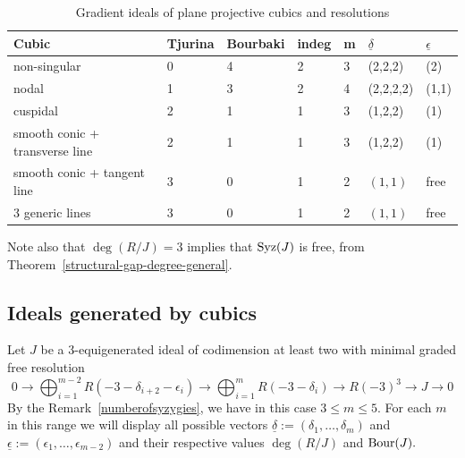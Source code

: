 \documentclass[11pt]{amsart} %
\theoremstyle{definition}
\def\syz{\mbox{\rm Syz}}
\begin{document}
\begin{table}[H]
\caption{Gradient ideals of plane projective cubics and resolutions}
\begin{tabular}{|l|l|l|l|l|l|l|}
\hline
Cubic                & Tjurina & Bourbaki & indeg & m & $\underline{\delta}$ & $\underline{\epsilon}$ \\ \hline
non-singular         & 0       & 4               & 2              & 3 & (2,2,2)                                            & (2)                                                  \\ \hline
nodal                & 1       & 3               & 2              & 4 & (2,2,2,2)                                          & (1,1)                                                \\ \hline
cuspidal             & 2       & 1               & 1              & 3 & (1,2,2)                                            & (1)                                                  \\ \hline
smooth conic + transverse line         & 2       & 1               & 1              & 3 & (1,2,2)                                            & (1)                                                  \\ \hline
smooth conic + tangent line & 3       & 0               & 1              & 2 & $(1,1)$                                               & free                                                 \\ \hline
3 generic lines      & 3       & 0               & 1              & 2 & $(1,1)$                                               & free    \\ \hline
\end{tabular}
\label{table:gradient-triples-cubics}
\end{table}
Note also that $\deg(R/J) = 3$ implies that $\syz(J)$ is free, from Theorem~\ref{structural-gap-degree-general}.

\subsection{Ideals generated by cubics}\label{subsec:ideals-cubics}
 
Let $J$ be a $3$-equigenerated ideal of codimension at least two with minimal graded free resolution  	\begin{equation}
	0\to \bigoplus_{i=1}^{m-2}R(-3-\delta_{i+2}-\epsilon_i)\to \bigoplus_{i=1}^m R(-3-\delta_i)\to R(-3)^3\to J\to 0
\end{equation} 
By the Remark~\ref{numberofsyzygies}, we have in this case  $3\leq m\leq 5.$
For each $m$ in this range we  will display all possible vectors $\underline{\delta}:=(\delta_1,\ldots,\delta_m)$ and   $\underline{\epsilon}:=(\epsilon_1,\ldots,\epsilon_{m-2})$ and their respective values $\deg(R/J)$ and ${\rm Bour}(J).$
\end{document}
